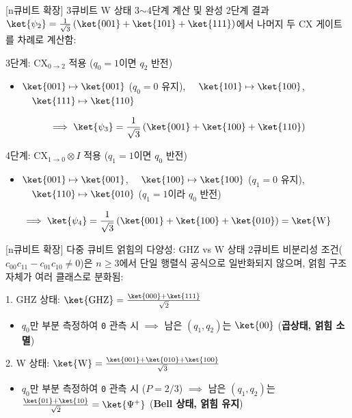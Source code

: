 \documentclass[aspectratio=169, 10pt]{beamer}
\begin{document}
\begin{frame}{[n큐비트 확장] 3큐비트 W 상태 3$\sim$4단계 계산 및 완성}
    2단계 결과 $\ket{\psi_2} = \frac{1}{\sqrt{3}}\left(\ket{001} + \ket{101} + \ket{111}\right)$에서 나머지 두 $\mathrm{CX}$ 게이트를 차례로 계산함:
    \pause
    \vspace{0.15cm}
    \begin{qcblock}{3단계: $\mathrm{CX}_{0\to 2}$ 적용 ($q_0 = 1$이면 $q_2$ 반전)}
        \begin{itemize}
            \item $\ket{001} \mapsto \ket{001}$ ($q_0=0$ 유지), $\quad \ket{101} \mapsto \ket{100}$, $\quad \ket{111} \mapsto \ket{110}$
        \end{itemize}
        $$\implies \ket{\psi_3} = \frac{1}{\sqrt{3}}\left(\ket{001} + \ket{100} + \ket{110}\right)$$
    \end{qcblock}
    \pause
    \vspace{0.1cm}
    \begin{qcalert}{4단계: $\mathrm{CX}_{1\to 0} \otimes I$ 적용 ($q_1 = 1$이면 $q_0$ 반전)}
        \begin{itemize}
            \item $\ket{001} \mapsto \ket{001}$, $\quad \ket{100} \mapsto \ket{100}$ ($q_1=0$ 유지), $\quad \ket{110} \mapsto \ket{010}$ ($q_1=1$이라 $q_0$ 반전)
        \end{itemize}
        $$\implies \ket{\psi_4} = \frac{1}{\sqrt{3}}\left(\ket{001} + \ket{100} + \ket{010}\right) = \ket{\mathrm{W}}$$
    \end{qcalert}
\end{frame}

\begin{frame}{[n큐비트 확장] 다중 큐비트 얽힘의 다양성: GHZ vs W 상태}
    2큐비트 비분리성 조건($c_{00}c_{11}-c_{01}c_{10} \neq 0$)은 $n \ge 3$에서 단일 행렬식 공식으로 일반화되지 않으며, 얽힘 구조 자체가 여러 클래스로 분화됨:
    \pause
    \vspace{0.15cm}
    \begin{qcblock}{1. GHZ 상태: $\ket{\mathrm{GHZ}} = \frac{\ket{000} + \ket{111}}{\sqrt{2}}$}
        \begin{itemize}
            \item $q_0$만 부분 측정하여 \texttt{0} 관측 시 $\implies$ 남은 $(q_1, q_2)$는 $\ket{00}$ (\textbf{곱상태, 얽힘 소멸})
        \end{itemize}
    \end{qcblock}
    \pause
    \vspace{0.1cm}
    \begin{qcalert}{2. W 상태: $\ket{\mathrm{W}} = \frac{\ket{001} + \ket{010} + \ket{100}}{\sqrt{3}}$}
        \begin{itemize}
            \item $q_0$만 부분 측정하여 \texttt{0} 관측 시 ($P=2/3$) $\implies$ 남은 $(q_1, q_2)$는 $\frac{\ket{01}+\ket{10}}{\sqrt{2}} = \ket{\Psi^+}$ (\textbf{Bell 상태, 얽힘 유지})
        \end{itemize}
    \end{qcalert}
\end{frame}
\end{document}
